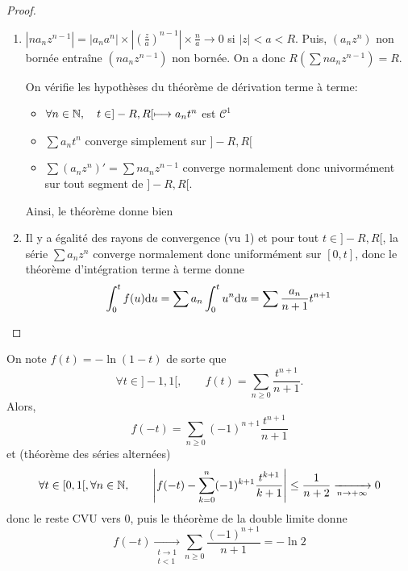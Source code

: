\begin{proof}
    \begin{enumerate}
        \item $|na_nz^{n-1}|=|a_na^n|\times \left| (\frac za)^{n-1} \right|\times \frac na\xrightarrow{}0$ si $|z|<a<R$. Puis, $(a_nz^n)$ non bornée entraîne $(na_nz^{n-1})$ non bornée. On a donc $R(\sum na_nz^{n-1})=R$.

            On vérifie les hypothèses du théorème de dérivation terme à terme: \begin{itemize}
                \item $\forall n\in\mathbb N, \quad t\in]-R,R[\longmapsto a_nt^n$ est $\mathcal C^1$
                \item $\sum a_nt^n$ converge simplement sur $]-R, R[$
                \item $\sum(a_nz^n)'=\sum na_nz^{n-1}$ converge normalement donc univormément sur tout segment de $]-R, R[$.
            \end{itemize}
            Ainsi, le théorème donne bien \conc
        \item Il y a égalité des rayons de convergence (vu 1) et pour tout $t\in ]-R,R[$, la série $\sum a_nz^n$ converge normalement donc uniformément sur $[0,t]$, donc le théorème d'intégration terme à terme donne \[
                \int_0^tf(u)\mathrm{d} u=\sum a_n\int_0^t u^n\mathrm{d} u=\sum \frac{a_n}{n+1}t^{n+1}
            \]
    \end{enumerate}
\end{proof}

\begin{ex}
    On note $f(t)=-\ln(1-t)$ de sorte que \[
        \forall t\in ]-1, 1[, \qquad f(t)=\sum_{n\geq 0}\frac{t^{n+1}}{n+1}.
    \]
    Alors, \[
        f(-t)=\sum_{n\geq 0}(-1)^{n+1}\frac{t^{n+1}}{n+1}
    \]
    et (théorème des séries alternées) \[
        \forall t\in[0, 1[, \forall n\in\mathbb N, \qquad \left|f(-t)-\sum_{k=0}^n(-1)^{k+1}\frac{t^{k+1}}{k+1}\right|\leq \frac1{n+2}\xrightarrow[n\to+\infty]{}0
    \]
    donc le reste CVU vers $0$, puis le théorème de la double limite donne \[
        f(-t)\xrightarrow[\substack{t\to1\\t<1}]{}\sum_{n\geq 0}\frac{(-1)^{n+1}}{n+1}=-\ln2
    \]
\end{ex}

